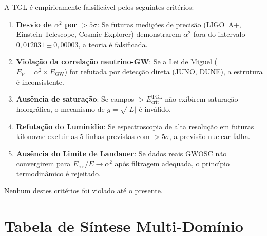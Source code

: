 \documentclass[12pt,a4paper,twoside]{article}
\newcommand{\alphaii}{\alpha^{2}}
\begin{document}
A TGL \'e empiricamente falsific\'avel pelos seguintes crit\'erios:

\begin{enumerate}[nosep]
\item \textbf{Desvio de $\alphaii$ por $> 5\sigma$}: Se futuras medi\c{c}\~oes de precis\~ao (LIGO~A+, Einstein Telescope, Cosmic Explorer) demonstrarem $\alphaii$ fora do intervalo $0{,}012031 \pm 0{,}00003$, a teoria \'e falsificada.
\item \textbf{Viola\c{c}\~ao da correla\c{c}\~ao neutrino-GW}: Se a Lei de Miguel ($E_\nu = \alphaii \times E_{\text{GW}}$) for refutada por detec\c{c}\~ao direta (JUNO, DUNE), a estrutura \'e inconsistente.
\item \textbf{Aus\^encia de satura\c{c}\~ao}: Se campos $> E_{\text{cr\'it}}^{\text{TGL}}$ n\~ao exibirem satura\c{c}\~ao hologr\'afica, o mecanismo de $g = \sqrt{|L|}$ \'e inv\'alido.
\item \textbf{Refuta\c{c}\~ao do Lumin\'idio}: Se espectroscopia de alta resolu\c{c}\~ao em futuras kilonovae excluir as 5 linhas previstas com $> 5\sigma$, a previs\~ao nuclear falha.
\item \textbf{Aus\^encia do Limite de Landauer}: Se dados reais GWOSC n\~ao convergirem para $E_{\text{res}}/E \to \alphaii$ ap\'os filtragem adequada, o princ\'ipio termodin\^amico \'e rejeitado.
\end{enumerate}

\noindent Nenhum destes crit\'erios foi violado at\'e o presente.


\section{Tabela de S\'intese Multi-Dom\'inio}
\end{document}
